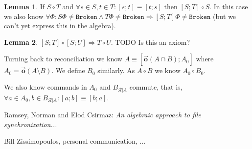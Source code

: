 \documentclass[12pt]{article}
\newcommand{\fsbroken}{\mathtt{Broken}} %
\newcommand{\FS}{\Phi} %
\newcommand{\coworks}{\circ}
\newcommand{\ordered}[1]{\vec{\mathbf{o}}({#1})}
\newcommand{\recchar}[3]{{#1}^{#3}_{\mathcal{R}|{#2}}}
\newcommand{\recb}{\recchar{B}{A}{}}
\theoremstyle{definition}
\newtheorem{mylem}{Lemma}
\begin{document}
\medskip

\begin{mylem}
If $S\coworks T$ and $\forall s\in S, t\in T: [s;t]\equiv[t;s]$
then $[S;T]\coworks S$.
In this case we also know
$\forall \FS: S\FS\neq\fsbroken \wedge T\FS\neq\fsbroken \Rightarrow [S;T]\FS\neq\fsbroken$
(but we can't yet express this in the algebra).
\end{mylem}

\begin{mylem}
$[S;T]\coworks[S;U]\Rightarrow T\coworks U$.
TODO Is this an axiom?
\end{mylem}

Turning back to reconciliation we know
$A\equiv[\ordered{A\cap B};A_0]$
where $A_0=\ordered{A\setminus B}$.
We define $B_0$ similarly.
As $A\coworks B$ we know $A_0\coworks B_0$.

We also know commands in $A_0$ and $\recb$ commute, that is,
$\forall a\in A_0, b\in\recb: [a;b]\equiv[b;a]$.



\begin{thebibliography}{99}

 Ramsey, Norman and Elod Csirmaz: {\it An algebraic approach to
file synchronization...}

 Bill Zissimopoulos, personal communication, ...

\end{thebibliography}
\end{document}
